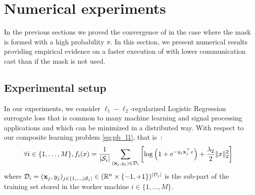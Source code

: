 \section{Numerical experiments}\label{sec:exps}
In the previous sections we proved the convergence of \SP{} in the case where the mask is formed with a high probability $\pi$. In this section, we present numerical results providing empirical evidence on a faster execution of \SP{} with lower communication cast than if the mask is not used.




\subsection{Experimental setup}


In our experiments, we consider $\ell_1-\ell_2$-regularized Logistic Regression surrogate loss that is common to many machine learning and signal processing applications and which can be minimized in a distributed way. With respect to our composite learning problem \eqref{eq:pb_l1}, that is~:
\begin{equation}\label{eq:log_reg}
    \forall i\in\{1,\ldots,M\}, f_i(x)= \frac{1}{|\mathcal{S}_i|}\sum_{(\mathbf{x}_j,y_j)\in \mathcal{D}_i}\left[\log\left(1 + e^{-y_j\mathbf{x}_j^\top x}\right) + \frac{\lambda_2}{2}\|x\|_2^2 \right]
\end{equation}
where $\mathcal{D}_i=(\mathbf{x}_j,y_j)_{j\in\{1,\ldots,|\mathcal{S}_j|}\in (\mathbb{R}^n\times \{-1,+1\})^{|\mathcal{D}_j|}$ is the sub-part of the training set stored in the worker machine $i\in\{1,\ldots,M\}$. %



